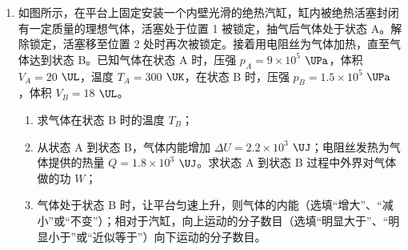 \documentclass[\gkver]{gaokaozhenti}
\begin{document}
\begin{enumerate}
{金属丝总长度为 $n\cdot\pi d$（每匝金属丝的周长为 $\pi d$，共 $n$ 匝），金属丝横截面积 $S=\pi\left(\frac{d_{\text{丝}}}{2}\right)^{2}$，绕线部分总长度 $L=nd_{\text{丝}}$，代入电阻定律 $R_{1}=\rho\frac{l_{\text{总}}}{S}$ 化简后可得该表达式 $\rho=\frac{R_{1}L^{2}}{4n^{3}d}$。

代入数值估算可得 $\rho\approx6\times10^{-7}$ $\UOm$

故选 B。

（4）不合理。

$R_{2}\approx10$ $\UO$ 阻值太小，分压电阻太大，电路中电流变化范围极小，多用电表 10 $\UmA$ 电流挡的读数误差很大。
}

\item
如图所示，在平台上固定安装一个内壁光滑的绝热汽缸，缸内被绝热活塞封闭有一定质量的理想气体，活塞处于位置 1 被锁定，抽气后气体处于状态 A。解除锁定，活塞移至位置 2 处时再次被锁定。接着用电阻丝为气体加热，直至气体达到状态 B。已知气体在状态 A 时，压强 $p_{A}=9\times10^{5}$ $\UPa$，体积 $V_{A}=20$ $\UL$，温度 $T_{A}=300$ $\UK$，在状态 B 时，压强 $p_{B}=1.5\times10^{5}$ $\UPa$，体积 $V_{B}=18$ $\UL$。
\begin{enumerate}
	\item
	求气体在状态 B 时的温度 $T_{B}$；
	\item
	从状态 A 到状态 B，气体内能增加 $\Delta U=2.2\times10^{3}$ $\UJ$；电阻丝发热为气体提供的热量 $Q=1.8\times10^{3}$ $\UJ$。求状态 A 到状态 B 过程中外界对气体做的功 $W$；
	\item
	气体处于状态 B 时，让平台匀速上升，则气体的内能（选填“增大”、“减小”或“不变”）；相对于汽缸，向上运动的分子数目（选填“明显大于”、“明显小于”或“近似等于”）向下运动的分子数目。
\end{enumerate}
\end{enumerate}
\end{document}
